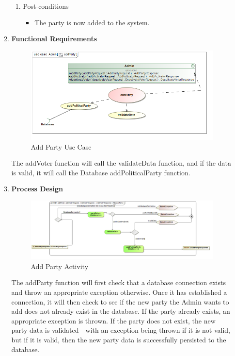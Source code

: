 \begin{enumerate}
\begin{enumerate}
\begin{enumerate}
				\item Post-conditions
				\begin{itemize}
					\item The party is now added to the system. 
				\end{itemize}
			\end{enumerate}
			
			\newpage
			
			\item \textbf{Functional Requirements}
			\begin{figure}[H]
				\centering
				\includegraphics[width=0.75\linewidth]{../Images/Admin/UseCases/addParty_useCase.png}
				\caption{Add Party Use Case}
			\end{figure}
			
			The addVoter function will call the validateData function, and if the data is valid, it will call the Database addPoliticalParty function.
			\newline
			
			\item \textbf{Process Design}
			\begin{figure}[H]
				\centering
				\includegraphics[width=0.75\linewidth]{../Images/Admin/ActivityDiagrams/addParty_ActivityDiagram.png}
				\caption{Add Party Activity}
			\end{figure}
			
		The addParty function will first check that a database connection exists and throw an appropriate exception otherwise. Once it has established a connection, it will then check to see if the new party the Admin wants to add does not already exist in the database. If the party already exists, an appropriate exception is thrown. If the party does not exist, the new party data is validated - with an exception being thrown if it is not valid, but if it is valid, then the new party data is successfully persisted to the database. 
			\newline
			
		\end{enumerate}
\end{enumerate}
